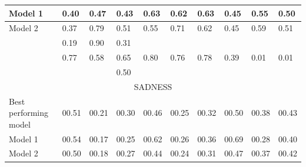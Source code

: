 \documentclass[
10pt, %
a4paper, %
oneside, %
headinclude,footinclude, %
BCOR5mm, %
]{scrartcl}
\begin{document}
\begin{table}[!htbp]
\begin{tabular}{|l|l|l|l|l|l|l|l|l|l|}
\hline
    \tiny{Model 1} & 
    \footnotesize{0.40} & 
    \footnotesize{0.47} & 
    \footnotesize{0.43} & 
    \footnotesize{0.63} & 
    \footnotesize{0.62} & 
    \footnotesize{0.63} & 
    \footnotesize{0.45} & 
    \footnotesize{0.55} & 
    \footnotesize{0.50} \\ 

\hline
    \tiny{Model 2} & 
    \footnotesize{0.37} & 
    \footnotesize{0.79} & 
    \footnotesize{0.51} & 
    \footnotesize{0.55} & 
    \footnotesize{0.71} & 
    \footnotesize{0.62} & 
    \footnotesize{0.45} & 
    \footnotesize{0.59} & 
    \footnotesize{0.51} \\ 

\hline 
    \tiny{\citep{strapparava2008learning} } &
    \footnotesize{0.19} & 
    \footnotesize{0.90} & 
    \footnotesize{0.31} &
    &
    &
    &
    &
    &
    \\

\hline
    \tiny{\citep{kim2010evaluation}} &
    \footnotesize{0.77} & 
    \footnotesize{0.58} & 
    \footnotesize{0.65} &
    \footnotesize{0.80} & 
    \footnotesize{0.76} & 
    \footnotesize{0.78} &
    \footnotesize{0.39} & 
    \footnotesize{0.01} & 
    \footnotesize{0.01} \\
    
\hline
    \tiny{\citep{danisman2008feeler}} &
    \footnotesize{} & 
    \footnotesize{} & 
    \footnotesize{0.50} &
    \footnotesize{} & 
    \footnotesize{} & 
    \footnotesize{} &
    \footnotesize{} & 
    \footnotesize{} & 
    \footnotesize{} \\
    
\hline
    \multicolumn{10}{|c|}{{SADNESS}} \\ 
    
\hline
    \tiny{Best performing model} & 
    \footnotesize{00.51} & 
    \footnotesize{00.21} & 
    \footnotesize{00.30} & 
    \footnotesize{00.46} & 
    \footnotesize{00.25} & 
    \footnotesize{00.32} & 
    \footnotesize{00.50} & 
    \footnotesize{00.38} & 
    \footnotesize{00.43} \\ 

\hline
    \tiny{Model 1} & 
    \footnotesize{00.54} & 
    \footnotesize{00.17} & 
    \footnotesize{00.25} & 
    \footnotesize{00.62} & 
    \footnotesize{00.26} & 
    \footnotesize{00.36} & 
    \footnotesize{00.69} & 
    \footnotesize{00.28} & 
    \footnotesize{00.40} \\ 

\hline
    \tiny{Model 2} & 
    \footnotesize{00.50} & 
    \footnotesize{00.18} & 
    \footnotesize{00.27} & 
    \footnotesize{00.44} & 
    \footnotesize{00.24} & 
    \footnotesize{00.31} & 
    \footnotesize{00.47} & 
    \footnotesize{00.37} & 
    \footnotesize{00.42} \\ 


\end{tabular}
\end{table}
\end{document}
